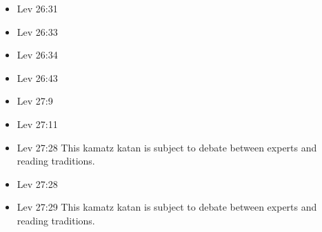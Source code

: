 \documentclass[14pt]{article}
\begin{document}
\begin{multicols}{2}
\begin{itemize}
\item Lev 26:31

\item Lev 26:33

\item Lev 26:34

\item Lev 26:43

\item Lev 27:9

\item Lev 27:11

\item Lev 27:28 This kamatz katan is subject to debate between experts and reading traditions.

\item Lev 27:28

\item Lev 27:29 This kamatz katan is subject to debate between experts and reading traditions.
\end{itemize}\end{multicols}
\end{document}
